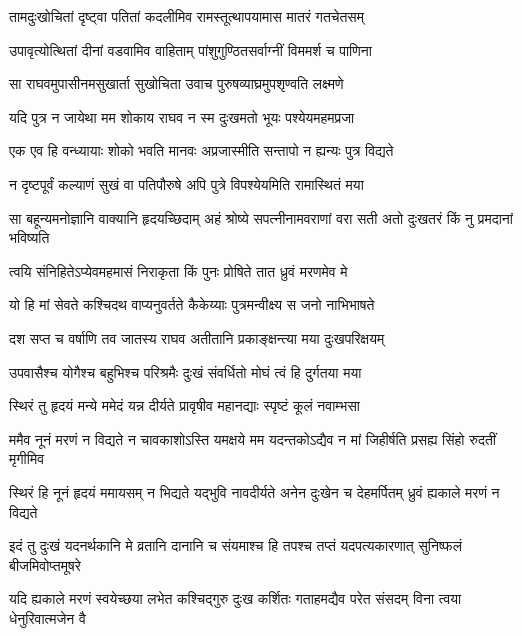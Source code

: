 \twolineshloka
{तामदुःखोचितां दृष्ट्वा पतितां कदलीमिव}
{रामस्तूत्थापयामास मातरं गतचेतसम्} %

\twolineshloka
{उपावृत्योत्थितां दीनां वडवामिव वाहिताम्}
{पांशुगुण्ठितसर्वाग्नीं विममर्श च पाणिना} %

\twolineshloka
{सा राघवमुपासीनमसुखार्ता सुखोचिता}
{उवाच पुरुषव्याघ्रमुपशृण्वति लक्ष्मणे} %

\twolineshloka
{यदि पुत्र न जायेथा मम शोकाय राघव}
{न स्म दुःखमतो भूयः पश्येयमहमप्रजा} %

\twolineshloka
{एक एव हि वन्ध्यायाः शोको भवति मानवः}
{अप्रजास्मीति सन्तापो न ह्यन्यः पुत्र विद्यते} %

\twolineshloka
{न दृष्टपूर्वं कल्याणं सुखं वा पतिपौरुषे}
{अपि पुत्रे विपश्येयमिति रामास्थितं मया} %

\threelineshloka
{सा बहून्यमनोज्ञानि वाक्यानि हृदयच्छिदाम्}
{अहं श्रोष्ये सपत्नीनामवराणां वरा सती}
{अतो दुःखतरं किं नु प्रमदानां भविष्यति} %

\twolineshloka
{त्वयि संनिहितेऽप्येवमहमासं निराकृता}
{किं पुनः प्रोषिते तात ध्रुवं मरणमेव मे} %

\twolineshloka
{यो हि मां सेवते कश्चिदथ वाप्यनुवर्तते}
{कैकेय्याः पुत्रमन्वीक्ष्य स जनो नाभिभाषते} %

\twolineshloka
{दश सप्त च वर्षाणि तव जातस्य राघव}
{अतीतानि प्रकाङ्क्षन्त्या मया दुःखपरिक्षयम्} %

\twolineshloka
{उपवासैश्च योगैश्च बहुभिश्च परिश्रमैः}
{दुःखं संवर्धितो मोघं त्वं हि दुर्गतया मया} %

\twolineshloka
{स्थिरं तु हृदयं मन्ये ममेदं यन्न दीर्यते}
{प्रावृषीव महानद्याः स्पृष्टं कूलं नवाम्भसा} %

\fourlineindentedshloka
{ममैव नूनं मरणं न विद्यते}
{न चावकाशोऽस्ति यमक्षये मम}
{यदन्तकोऽद्यैव न मां जिहीर्षति}
{प्रसह्य सिंहो रुदतीं मृगीमिव} %

\fourlineindentedshloka
{स्थिरं हि नूनं हृदयं ममायसम्}
{न भिद्यते यद्भुवि नावदीर्यते}
{अनेन दुःखेन च देहमर्पितम्}
{ध्रुवं ह्यकाले मरणं न विद्यते} %

\fourlineindentedshloka
{इदं तु दुःखं यदनर्थकानि मे}
{व्रतानि दानानि च संयमाश्च हि}
{तपश्च तप्तं यदपत्यकारणात्}
{सुनिष्फलं बीजमिवोप्तमूषरे} %

\fourlineindentedshloka
{यदि ह्यकाले मरणं स्वयेच्छया}
{लभेत कश्चिद्गुरु दुःख कर्शितः}
{गताहमद्यैव परेत संसदम्}
{विना त्वया धेनुरिवात्मजेन वै} %


